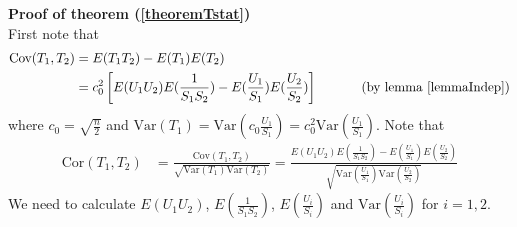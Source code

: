 \documentclass[12pt, a4paper]{article}
\begin{document}
	\textbf{Proof of theorem (\ref{theoremTstat})} \\
	First note that
	\begin{align*}
		\text{Cov}(T_1, T_2) &= E(T_1T_2) - E(T_1)E(T_2) \\
		& = c_0^2 \left[E(U_1U_2)E(\frac{1}{S_1S_2}) - E(\frac{U_1}{S_1})E( \frac{U_2}{S_2})\right]   
		~~~~~~~~~\text{ (by lemma \ref{lemmaIndep})}
	\end{align*}
	where $c_0 = \sqrt{\frac{n}{2}}$ and $\text{Var}(T_1) = \text{Var}(c_0\frac{U_1}{S_1})=
	c_0^2\text{Var}(\frac{U_1}{S_1})$. 
	Note that 
	\begin{align}\label{Tcorrelation}
		\text{Cor}(T_1, T_2) & = \frac{\text{Cov}(T_1, T_2) }{\sqrt{\text{Var}(T_1) \text{Var}(T_2) }} =
		\frac{E(U_1U_2)E(\frac{1}{S_1S_2}) - E(\frac{U_1}{S_1})E(
			\frac{U_2}{S_2})}{\sqrt{\text{Var}(\frac{U_1}{S_1})\text{Var}(\frac{U_2}{S_2})}} 
	\end{align}
	We need to calculate $E(U_1U_2)$, $E(\frac{1}{S_1S_2})$, $ E(\frac{U_i}{S_i})$ and
	$\text{Var}(\frac{U_i}{S_i})$ for $i =1, 2$. 
\end{document}
